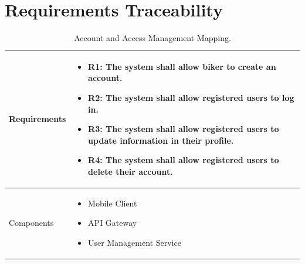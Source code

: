 \section{Requirements Traceability}

\begin{table}[H]
    \centering
    \renewcommand{\arraystretch}{1.3}
    \begin{tabular}{|p{}|p{}|}
        \hline
        Requirements & \begin{itemize}[topsep=0pt, partopsep=0pt, leftmargin=*] 
            \item R1: The system shall allow biker to create an account.
            \item R2: The system shall allow registered users to log in.
            \item R3: The system shall allow registered users to update information in their profile.
            \item R4: The system shall allow registered users to delete their account.
        \end{itemize} \\
        \hline
        Components & \begin{itemize}[topsep=0pt, partopsep=0pt, leftmargin=*] 
            \item Mobile Client
            \item API Gateway
            \item User Management Service
        \end{itemize} \\
        \hline
    \end{tabular}
    \caption{Account and Access Management Mapping.}
    \label{tab:account_mapping}
\end{table}

